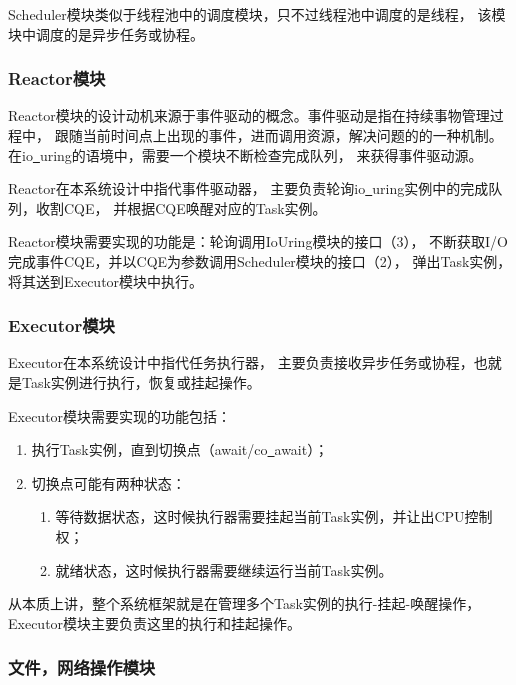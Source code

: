 \documentclass[supercite]{HustGraduPaper}
\theoremstyle{definition}
\begin{document}
Scheduler模块类似于线程池中的调度模块，只不过线程池中调度的是线程，
该模块中调度的是异步任务或协程。\par

\subsubsection{Reactor模块}

Reactor模块的设计动机来源于事件驱动的概念。事件驱动是指在持续事物管理过程中，
跟随当前时间点上出现的事件，进而调用资源，解决问题的的一种机制。
在io\underline{~}uring的语境中，需要一个模块不断检查完成队列，
来获得事件驱动源。\par

Reactor在本系统设计中指代事件驱动器，
主要负责轮询io\underline{~}uring实例中的完成队列，收割CQE，
并根据CQE唤醒对应的Task实例。\par

Reactor模块需要实现的功能是：轮询调用IoUring模块的接口（3），
不断获取I/O完成事件CQE，并以CQE为参数调用Scheduler模块的接口（2），
弹出Task实例，将其送到Executor模块中执行。\par

\subsubsection{Executor模块}

Executor在本系统设计中指代任务执行器，
主要负责接收异步任务或协程，也就是Task实例进行执行，恢复或挂起操作。\par

Executor模块需要实现的功能包括：

\begin{enumerate}
  \item 执行Task实例，直到切换点（await/co\underline{~}await）；
  \item 切换点可能有两种状态：
    \begin{enumerate}
      \item 等待数据状态，这时候执行器需要挂起当前Task实例，并让出CPU控制权；
      \item 就绪状态，这时候执行器需要继续运行当前Task实例。
    \end{enumerate}
\end{enumerate}

从本质上讲，整个系统框架就是在管理多个Task实例的执行-挂起-唤醒操作，
Executor模块主要负责这里的执行和挂起操作。\par

\subsubsection{文件，网络操作模块}
\end{document}
